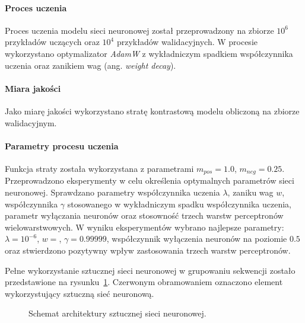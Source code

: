             \paragraph{Proces uczenia}
                Proces uczenia modelu sieci neuronowej został przeprowadzony na zbiorze $10^{6}$ przykładów uczących oraz $10^{4}$ przykładów walidacyjnych. 
                W procesie wykorzystano optymalizator \textit{AdamW}\cite{Loshchilov2017DecoupledWD} z wykładniczym spadkiem współczynnika uczenia oraz zanikiem wag (ang. \textit{weight decay}).
            
            \paragraph{Miara jakości}
                Jako miarę jakości wykorzystano stratę kontrastową modelu obliczoną na zbiorze walidacyjnym.

            \paragraph{Parametry procesu uczenia}
                Funkcja straty została wykorzystana z parametrami $m_{pos} = 1.0$, $m_{neg} = 0.25$.
                Przeprowadzono eksperymenty w celu określenia optymalnych parametrów sieci neuronowej. Sprawdzano parametry współczynnika uczenia $\lambda$, zaniku wag $w$, współczynnika $\gamma$ stosowanego w wykładniczym spadku współczynnika uczenia, parametr wyłączania neuronów oraz stosowność trzech warstw perceptronów wielowarstwowych. 
                W wyniku eksperymentów wybrano najlepsze parametry: $\lambda = 10^{-6}$, $w = $, $\gamma=0.99999$, współczynnik wyłączenia neuronów na poziomie $0.5$ oraz stwierdzono pozytywny wpływ zastosowania trzech warstw perceptronów. 

            Pełne wykorzystanie sztucznej sieci neuronowej w grupowaniu sekwencji zostało przedstawione na rysunku~\ref{Picture:Cluster:Neural}. Czerwonym obramowaniem oznaczono element wykorzystujący sztuczną sieć neuronową.

            \begin{figure}
                \begin{center}
                    
                \end{center}
                \caption{
                    Schemat architektury sztucznej sieci neuronowej.
                }\label{Picture:Cluster:Neural}
            \end{figure}

